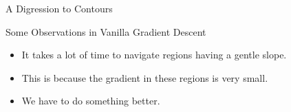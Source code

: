 \documentclass[10pt, aspectratio=169]{beamer}
\begin{document}
\begin{frame}{A Digression to Contours}
\end{frame}


\begin{frame}
\begin{block}{Some Observations in Vanilla Gradient Descent}
\begin{itemize}
\item<2-> It takes a lot of time to navigate regions having a gentle slope.
\item<3-> This is because the gradient in these regions is very small.
\item<4-> We have to do something better.
\end{itemize}
\end{block}
\end{frame}
\end{document}
